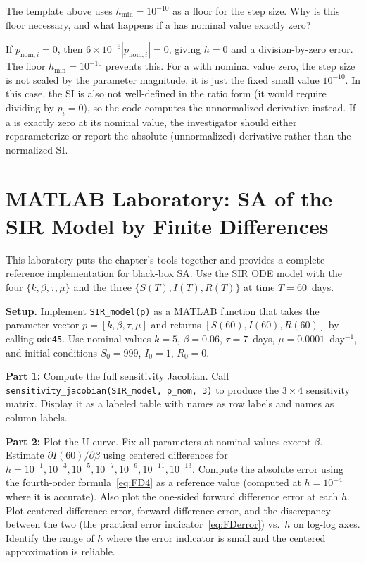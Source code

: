 \begin{selfcheck}
The template above uses $h_{\min} = 10^{-10}$ as a floor for the
step size. Why is this floor necessary, and what happens if a
\POI has nominal value exactly zero?
\end{selfcheck}
\begin{scAnswer}
If $p_{\text{nom},i} = 0$, then $6 \times 10^{-6}|p_{\text{nom},i}| = 0$,
giving $h = 0$ and a division-by-zero error.
The floor $h_{\min} = 10^{-10}$ prevents this.
For a \POI with nominal value zero, the step size is not scaled
by the parameter magnitude, it is just the fixed small value $10^{-10}$.
In this case, the SI is also not well-defined in the ratio form
(it would require dividing by $p_i = 0$), so the code computes
the unnormalized derivative instead.
If a \POI is exactly zero at its nominal value, the
investigator should either reparameterize or report the
absolute (unnormalized) derivative rather than the normalized SI.
\end{scAnswer}

\section[MATLAB Laboratory]{MATLAB Laboratory: SA of the SIR Model by Finite Differences}
\label{sec:ch3matlab}

This laboratory puts the chapter's tools together and provides
a complete reference implementation for black-box SA.
Use the SIR ODE model with the four \POIs $\{k, \beta, \tau, \mu\}$
and the three \QOIs $\{S(T), I(T), R(T)\}$ at time $T = 60$~days.

\textbf{Setup.}
Implement \texttt{SIR\_model(p)} as a MATLAB function that takes
the parameter vector $p = [k, \beta, \tau, \mu]$ and returns
$[S(60), I(60), R(60)]$ by calling \texttt{ode45}.
Use nominal values $k = 5$, $\beta = 0.06$, $\tau = 7$~days,
$\mu = 0.0001$~day$^{-1}$, and initial conditions
$S_0 = 999$, $I_0 = 1$, $R_0 = 0$.

\textbf{Part 1:} Compute the full sensitivity Jacobian.
Call \texttt{sensitivity\_jacobian(SIR\_model, p\_nom, 3)}
to produce the $3 \times 4$ sensitivity matrix.
Display it as a labeled table with \QOI names as row labels
and \POI names as column labels.

\textbf{Part 2:} Plot the U-curve.
Fix all parameters at nominal values except $\beta$.
Estimate $\partial I(60)/\partial\beta$ using centered differences
for $h = 10^{-1}, 10^{-3}, 10^{-5}, 10^{-7}, 10^{-9}, 10^{-11}, 10^{-13}$.
Compute the absolute error using the fourth-order formula~\eqref{eq:FD4}
as a reference value (computed at $h = 10^{-4}$ where it is accurate).
Also plot the one-sided forward difference error at each $h$.
Plot centered-difference error, forward-difference error, and the
discrepancy between the two (the practical error indicator~\eqref{eq:FDerror})
vs.\ $h$ on log-log axes. Identify the range of $h$ where the
error indicator is small and the centered approximation is reliable.

